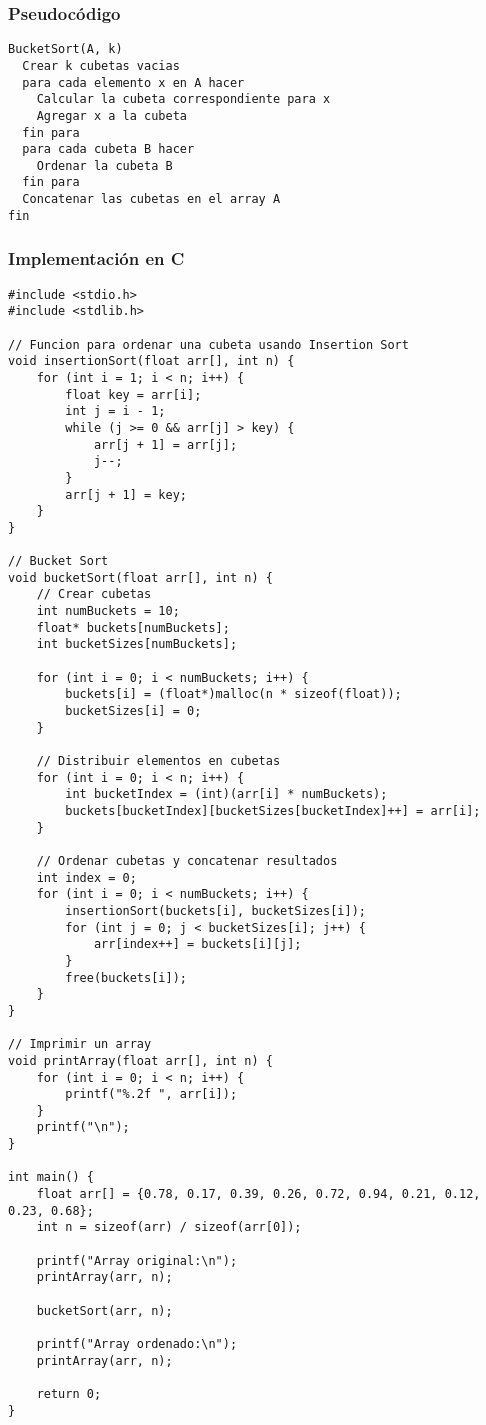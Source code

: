 \documentclass[11pt,openany]{book}
\begin{document}
\subsubsection{Pseudocódigo}
\begin{lstlisting}
BucketSort(A, k)
  Crear k cubetas vacias
  para cada elemento x en A hacer
    Calcular la cubeta correspondiente para x
    Agregar x a la cubeta
  fin para
  para cada cubeta B hacer
    Ordenar la cubeta B
  fin para
  Concatenar las cubetas en el array A
fin
\end{lstlisting}


\subsubsection{Implementación en C}
\lstset{language=C}
\begin{lstlisting}
#include <stdio.h>
#include <stdlib.h>

// Funcion para ordenar una cubeta usando Insertion Sort
void insertionSort(float arr[], int n) {
    for (int i = 1; i < n; i++) {
        float key = arr[i];
        int j = i - 1;
        while (j >= 0 && arr[j] > key) {
            arr[j + 1] = arr[j];
            j--;
        }
        arr[j + 1] = key;
    }
}

// Bucket Sort
void bucketSort(float arr[], int n) {
    // Crear cubetas
    int numBuckets = 10;
    float* buckets[numBuckets];
    int bucketSizes[numBuckets];

    for (int i = 0; i < numBuckets; i++) {
        buckets[i] = (float*)malloc(n * sizeof(float));
        bucketSizes[i] = 0;
    }

    // Distribuir elementos en cubetas
    for (int i = 0; i < n; i++) {
        int bucketIndex = (int)(arr[i] * numBuckets);
        buckets[bucketIndex][bucketSizes[bucketIndex]++] = arr[i];
    }

    // Ordenar cubetas y concatenar resultados
    int index = 0;
    for (int i = 0; i < numBuckets; i++) {
        insertionSort(buckets[i], bucketSizes[i]);
        for (int j = 0; j < bucketSizes[i]; j++) {
            arr[index++] = buckets[i][j];
        }
        free(buckets[i]);
    }
}

// Imprimir un array
void printArray(float arr[], int n) {
    for (int i = 0; i < n; i++) {
        printf("%.2f ", arr[i]);
    }
    printf("\n");
}

int main() {
    float arr[] = {0.78, 0.17, 0.39, 0.26, 0.72, 0.94, 0.21, 0.12, 0.23, 0.68};
    int n = sizeof(arr) / sizeof(arr[0]);

    printf("Array original:\n");
    printArray(arr, n);

    bucketSort(arr, n);

    printf("Array ordenado:\n");
    printArray(arr, n);

    return 0;
}
\end{lstlisting}
\end{document}
